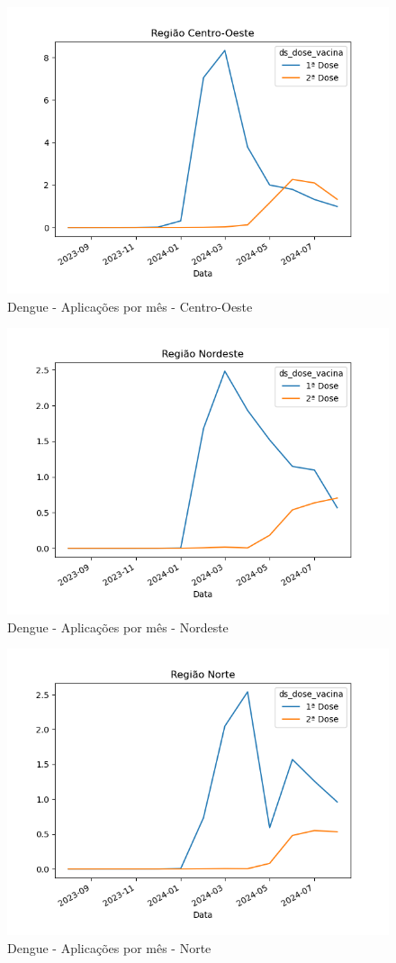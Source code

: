 \documentclass[12pt]{article}
\begin{document}
\begin{figure}[H]
    \centering
    \includegraphics[width=0.85\linewidth]{imagens/Dengue-Centro-Oeste-Aplicacoes-mes}
    \caption{Dengue - Aplicações por mês - Centro-Oeste}
    \label{fig:dengue-centro-oeste-aplicacoes}
\end{figure}
\begin{figure}[H]
    \centering
    \includegraphics[width=0.85\linewidth]{imagens/Dengue-Nordeste-Aplicacoes-mes}
    \caption{Dengue - Aplicações por mês - Nordeste}
    \label{fig:dengue-nordeste-aplicacoes-mes}
\end{figure}
\begin{figure}[H]
    \centering
    \includegraphics[width=0.85\linewidth]{imagens/Dengue-Norte-Aplicacoes-mes}
    \caption{Dengue - Aplicações por mês - Norte}
    \label{fig:dengue-norte-aplicacoes-mes}
\end{figure}
\end{document}
